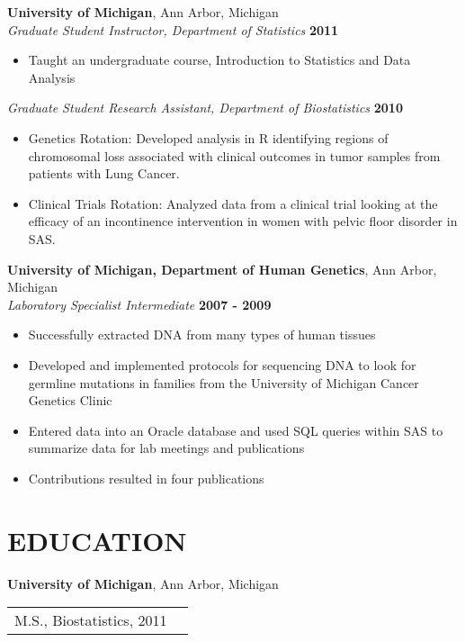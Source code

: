 \documentclass{res}
\begin{document}
\begin{resume}
\textbf{University of Michigan}, Ann Arbor, Michigan\\
\textit{Graduate Student Instructor, Department of Statistics} \hfill \textbf{2011}
\begin{itemize} \itemsep -2pt
\item Taught an undergraduate course, Introduction to Statistics and Data Analysis
\end{itemize}
\textit{Graduate Student Research Assistant, Department of Biostatistics} \hfill \textbf{2010}
\begin{itemize} \itemsep -2pt
\item Genetics Rotation: Developed analysis in R identifying regions of chromosomal loss associated with clinical outcomes in tumor samples from patients with Lung Cancer.
\item Clinical Trials Rotation: Analyzed data from a clinical trial looking at the efficacy of an incontinence intervention in women with pelvic floor disorder in SAS.  
\end{itemize}

\textbf{University of Michigan, Department of Human Genetics}, Ann Arbor, Michigan\\
\textit{Laboratory Specialist Intermediate} \hfill \textbf{2007 - 2009}
\begin{itemize} \itemsep -2pt
\item Successfully extracted DNA from many types of human tissues
\item Developed and implemented protocols for sequencing DNA to look for germline mutations in families from the University of Michigan Cancer Genetics Clinic
\item Entered data into an Oracle database and used SQL queries within SAS to summarize data for lab meetings and publications
\item Contributions resulted in four publications
\end{itemize}

\section{EDUCATION}
\vspace*{+0.2cm}
\textbf{University of Michigan}, Ann Arbor, Michigan\\
\begin{tabular}{ p{10cm} l } 
M.S., {Biostatistics}, 2011\\
\end{tabular}


\end{resume}
\end{document}
